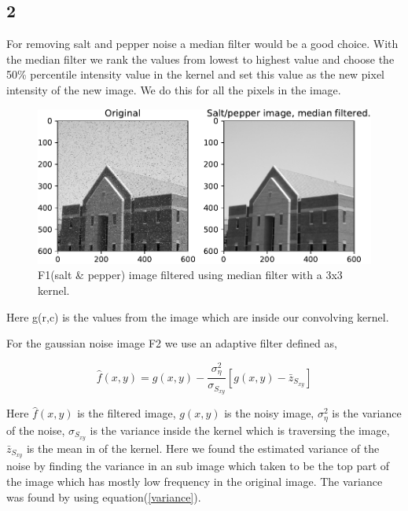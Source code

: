 {\subsection{2}

For removing salt and pepper noise a median filter would be a good choice. With the median filter we rank the values from lowest to highest value and choose the 50\% percentile intensity value in the kernel and set this value as the new pixel intensity of the new image. We do this for all the pixels in the image.


\begin{figure}[!htb]
    {\centering
        \includegraphics[width=1\textwidth]{Filtered_saltimage.pdf}
        \caption{F1(salt \& pepper) image filtered using median filter with a 3x3 kernel.}
        \label{salt}
    \par}
    \end{figure}
Here g(r,c) is the values from the image which are inside our convolving kernel.

For the gaussian noise image F2 we use an adaptive filter defined as,

\begin{equation}
    \hat{f}(x,y) = g(x,y) - \frac{\sigma^{2}_{\eta}}{\sigma_{S_{xy}}}\left[g(x,y) - \bar{z}_{S_{xy}}\right]
    \label{adaptive}
\end{equation}

Here $\hat{f}(x,y)$ is the filtered image, $g(x,y)$ is the noisy image, $\sigma^{2}_{\eta}$ is the variance of the noise, $\sigma_{S_{xy}}$ is the variance inside the kernel which is traversing the image, $\bar{z}_{S_{xy}}$ is the mean in of the kernel. Here we found the estimated variance of the noise by finding the variance in an sub image which taken to be the top part of the image which has mostly low frequency in the original image. The variance was found by using equation(\ref{variance}).

}
